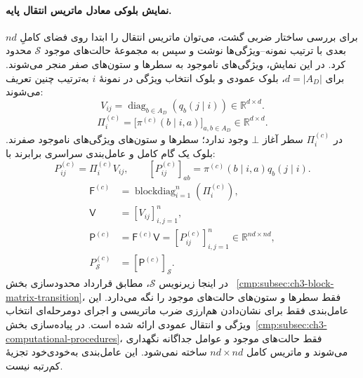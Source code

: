 \paragraph{نمایش بلوکی معادل ماتریس انتقال پایه.}
برای بررسی ساختار ضربی گشت، می‌توان ماتریس انتقال
را ابتدا روی فضای کاملِ $nd$بعدی با ترتیب
نمونه--ویژگی‌ها نوشت و سپس به مجموعهٔ حالت‌های
موجود $\mathcal S$ محدود کرد. در این نمایش،
ویژگی‌های ناموجود به سطرها و ستون‌های صفر
منجر می‌شوند. برای $d=|A_D|$، بلوک عمودی
و بلوک انتخاب ویژگی در نمونهٔ $i$ به‌ترتیب
چنین تعریف می‌شوند:
\begin{equation}\label{cmp:eq:ch3-block-diagonal-V}
V_{ij}
=\operatorname{diag}_{b\in A_D}(q_b(j\mid i))
\in\mathbb R^{d\times d}.
\end{equation}
\begin{equation}\label{cmp:eq:ch3-intermediate-policy-matrix}
\Pi_i^{(c)}
=\bigl[\pi^{(c)}(b\mid i,a)\bigr]_{a,b\in A_D}
\in\mathbb R^{d\times d}.
\end{equation}
در $\Pi_i^{(c)}$ سطر آغاز $\bot$ وجود ندارد؛
سطرها و ستون‌های ویژگی‌های ناموجود صفرند.
بلوک یک گام کامل و عامل‌بندی سراسری برابرند با:
\begin{equation}\label{cmp:eq:ch3-block-Tij}
\boxed{
P_{ij}^{(c)}
=\Pi_i^{(c)}V_{ij},
\qquad
[P_{ij}^{(c)}]_{ab}
=\pi^{(c)}(b\mid i,a)q_b(j\mid i).
}
\end{equation}
\begin{equation}\label{cmp:eq:ch3-block-factorization}
\boxed{
\begin{aligned}
\mathsf F^{(c)}
&=\operatorname{blockdiag}_{i=1}^{n}(\Pi_i^{(c)}),\\
\mathsf V&=[V_{ij}]_{i,j=1}^{n},\\
\mathsf P^{(c)}
&=\mathsf F^{(c)}\mathsf V
=[P_{ij}^{(c)}]_{i,j=1}^{n}
\in\mathbb R^{nd\times nd},\\
P_{\mathcal S}^{(c)}
&=[\mathsf P^{(c)}]_{\mathcal S}.
\end{aligned}
}
\end{equation}
در اینجا زیرنویس $\mathcal S$، مطابق
قرارداد محدودسازی بخش~
\ref{cmp:subsec:ch3-block-matrix-transition}،
فقط سطرها و ستون‌های حالت‌های موجود
را نگه می‌دارد. این عامل‌بندی فقط برای نشان‌دادن هم‌ارزی
ضرب ماتریسی و اجرای دومرحله‌ای انتخاب ویژگی
و انتقال عمودی ارائه شده است. در پیاده‌سازی
بخش~\ref{cmp:subsec:ch3-computational-procedures}،
فقط حالت‌های موجود و عوامل جداگانه نگهداری
می‌شوند و ماتریس کامل $nd\times nd$ ساخته نمی‌شود.
این عامل‌بندی به‌خودی‌خود تجزیهٔ کم‌رتبه نیست.

